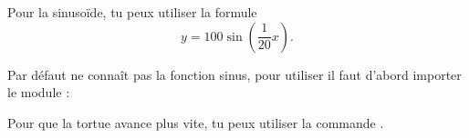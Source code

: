 \documentclass[11pt,class=report,crop=false]{standalone}
\begin{document}
\begin{activite}
Pour la sinuso\"ide, tu peux utiliser la formule 
$$y = 100\sin\left(\frac{1}{20}x\right).$$
  
Par défaut \Python{} ne connaît pas la fonction sinus, pour utiliser  il faut d'abord importer le module  :\\
\centerline{}

Pour que la tortue avance plus vite, tu peux utiliser la commande .
\end{activite}




\begin{activite}




\end{activite}
\end{document}
